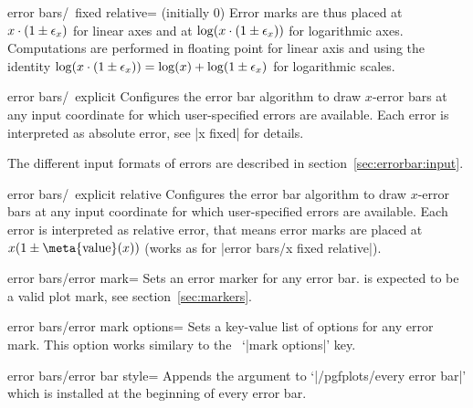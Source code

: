 {\begin{pgfplotsxykey}{error bars/\x\ fixed relative= (initially 0)}
Error marks are thus placed at $x \cdot (1 \pm \epsilon_{x})$ for linear axes and at $\log(x \cdot (1 \pm \epsilon_{x}))$ for logarithmic axes. Computations are performed in floating point for linear axis and using the identity $\log(x \cdot (1 \pm \epsilon_{x})) = \log(x) + \log( 1 \pm \epsilon_{x})$ for logarithmic scales.
\end{pgfplotsxykey}

\begin{pgfplotsxykey}{error bars/\x\ explicit}
Configures the error bar algorithm to draw $x$-error bars at any input coordinate for which user-specified errors are available.
 Each error is interpreted as absolute error, see |x fixed| for details.

The different input formats of errors are described in section~\ref{sec:errorbar:input}.
\end{pgfplotsxykey}

\begin{pgfplotsxykey}{error bars/\x\ explicit relative}
Configures the error bar algorithm to draw $x$-error bars at any input coordinate for which user-specified errors are available.
 Each error is interpreted as relative error, that means error marks are placed at $x (1 \pm \text{\meta{value}}(x))$ (works as for |error bars/x fixed relative|).
\end{pgfplotsxykey}


\begin{pgfplotskey}{error bars/error mark=}
Sets an error marker for any error bar.  is expected to be a valid plot mark, see section~\ref{sec:markers}.
\end{pgfplotskey}

\begin{pgfplotskey}{error bars/error mark options=}
Sets a key-value list of options for any error mark. This option works similary to the \Tikz\ `|mark options|' key.
\end{pgfplotskey}

\begin{pgfplotskey}{error bars/error bar style=}
Appends the argument to `|/pgfplots/every error bar|' which is installed at the beginning of every error bar.
\end{pgfplotskey}

}
